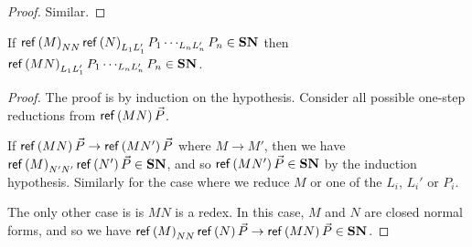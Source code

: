 \begin{proof}
Similar.
\end{proof}

\begin{lemma}
\label{lm:SNred1}
If $\mathsf{ref} \left( {M} \right)_{NN} \mathsf{ref} \left( {N} \right)_{L_1 L_1'} P_1 \cdots_{L_n L_n'} P_n \in \mathbf{SN}$ then \\
$\mathsf{ref} \left( {MN} \right)_{L_1 L_1'} P_1 \cdots_{L_n L_n'} P_n \in \mathbf{SN}$.
\end{lemma}

\begin{proof}
The proof is by induction on the hypothesis.  Consider all possible one-step reductions from $\mathsf{ref} \left( {MN} \right) \vec{P}$.

If $\mathsf{ref} \left( {MN} \right) \vec{P} \rightarrow \mathsf{ref} \left( {MN'} \right) \vec{P}$ where $M \rightarrow M'$, then we have $\mathsf{ref} \left( {M} \right)_{N' N'} \mathsf{ref} \left( {N'} \right) \vec{P} \in \mathbf{SN}$, and so
$\mathsf{ref} \left( {MN'} \right) \vec{P} \in \mathbf{SN}$ by the induction hypothesis.  Similarly for the case where we reduce $M$ or one of the $L_i$, $L_i'$ or $P_i$.

The only other case is is $MN$ is a redex.  In this case, $M$ and $N$ are closed normal forms, and so we have $\mathsf{ref} \left( {M} \right)_{NN} \mathsf{ref} \left( {N} \right) \vec{P} \rightarrow \mathsf{ref} \left( {MN} \right) \vec{P} \in \mathbf{SN}$.
\end{proof}